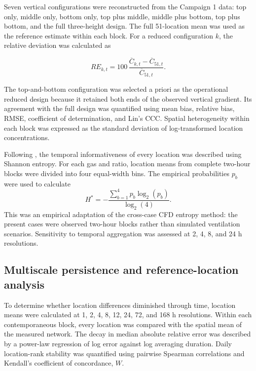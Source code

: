 \documentclass[12pt,a4paper]{article}
\begin{document}
Seven vertical configurations were reconstructed from the Campaign 1 data:
top only, middle only, bottom only, top plus middle, middle plus bottom, top
plus bottom, and the full three-height design. The full 51-location mean was
used as the reference estimate within each block. For a reduced configuration
\(k\), the relative deviation was calculated as

\begin{equation}
RE_{k,t}=100\,
\frac{\overline{C}_{k,t}-\overline{C}_{51,t}}
     {\overline{C}_{51,t}}.
\end{equation}

The top-and-bottom configuration was selected a priori as the operational
reduced design because it retained both ends of the observed vertical
gradient. Its agreement with the full design was quantified using mean bias,
relative bias, RMSE, coefficient of determination, and Lin's CCC. Spatial
heterogeneity within each block was expressed as the standard deviation of
log-transformed location concentrations.

Following \citet{Chen2026}, the temporal informativeness of every location was
described using Shannon entropy. For each gas and ratio, location means from
complete two-hour blocks were divided into four equal-width bins. The
empirical probabilities \(p_b\) were used to calculate
\begin{equation}
H^*=-\frac{\sum_{b=1}^{4}p_b\log_2(p_b)}{\log_2(4)}.
\end{equation}
This was an empirical adaptation of the cross-case CFD entropy method: the
present cases were observed two-hour blocks rather than simulated ventilation
scenarios. Sensitivity to temporal aggregation was assessed at 2, 4, 8, and
24 h resolutions.

\subsection{Multiscale persistence and reference-location analysis}

To determine whether location differences diminished through time, location
means were calculated at 1, 2, 4, 8, 12, 24, 72, and 168 h resolutions. Within
each contemporaneous block, every location was compared with the spatial mean
of the measured network. The decay in median absolute relative error was
described by a power-law regression of log error against log averaging
duration. Daily location-rank stability was quantified using pairwise Spearman
correlations and Kendall's coefficient of concordance, \(W\).
\end{document}
